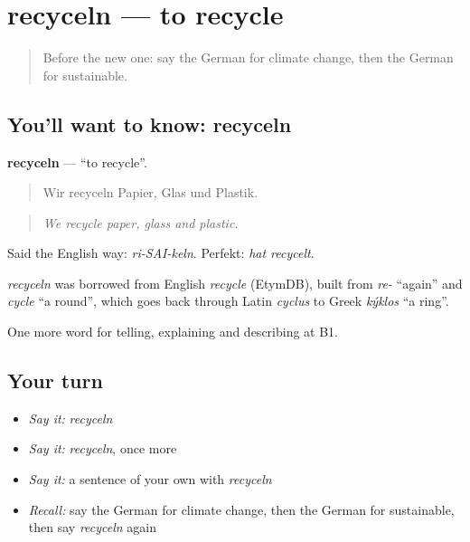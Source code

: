\section[recyceln]{recyceln — to recycle}

\label{lesson:GE-C363-recyceln}



\begin{quote}
Before the new one: say the German for climate change, then the German for sustainable.
\end{quote}

\subsection*{You'll want to know: recyceln}
\textbf{recyceln} — \textquotedblleft{}to recycle\textquotedblright{}.

\begin{quote}
Wir recyceln Papier, Glas und Plastik.
\end{quote}

\begin{quote}
\emph{We recycle paper, glass and plastic.}
\end{quote}

Said the English way: \emph{ri-SAI-keln}. Perfekt: \emph{hat recycelt}.

\begin{cousinweb}
\emph{recyceln} was borrowed from English \emph{recycle} (EtymDB), built from \emph{re-} \textquotedblleft{}again\textquotedblright{} and \emph{cycle} \textquotedblleft{}a round\textquotedblright{}, which goes back through Latin \emph{cyclus} to Greek \emph{kýklos} \textquotedblleft{}a ring\textquotedblright{}.
\end{cousinweb}

\begin{grammarlens}[title={What you've built}]
One more word for telling, explaining and describing at B1.
\end{grammarlens}

\subsection*{Your turn}
\begin{itemize}
\raggedright
  \item \emph{Say it:} \emph{recyceln}
  \item \emph{Say it:} \emph{recyceln}, once more
  \item \emph{Say it:} a sentence of your own with \emph{recyceln}
  \item \emph{Recall:} say the German for climate change, then the German for sustainable, then say \emph{recyceln} again
\end{itemize}


